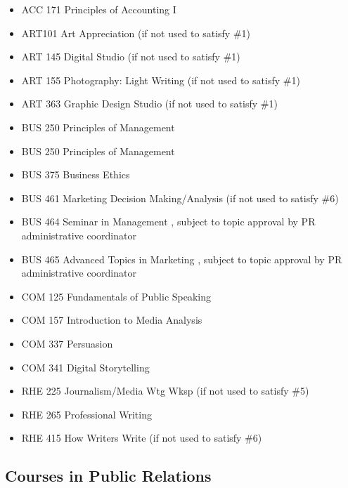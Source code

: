 \documentclass[
  letterpaper,
]{scrbook}
\providecommand{\tightlist}{%
  \setlength{\itemsep}{0pt}\setlength{\parskip}{0pt}}
\begin{document}
\begin{enumerate}
  \begin{itemize}
  \tightlist
  \item
    ACC 171 Principles of Accounting I
  \item
    ART101 Art Appreciation (if not used to satisfy \#1)
  \item
    ART 145 Digital Studio (if not used to satisfy \#1)
  \item
    ART 155 Photography: Light Writing (if not used to satisfy \#1)
  \item
    ART 363 Graphic Design Studio (if not used to satisfy \#1)
  \item
    BUS 250 Principles of Management
  \item
    BUS 250 Principles of Management
  \item
    BUS 375 Business Ethics
  \item
    BUS 461 Marketing Decision Making/Analysis (if not used to satisfy
    \#6)
  \item
    BUS 464 Seminar in Management , subject to topic approval by PR
    administrative coordinator
  \item
    BUS 465 Advanced Topics in Marketing , subject to topic approval by
    PR administrative coordinator
  \item
    COM 125 Fundamentals of Public Speaking
  \item
    COM 157 Introduction to Media Analysis
  \item
    COM 337 Persuasion
  \item
    COM 341 Digital Storytelling
  \item
    RHE 225 Journalism/Media Wtg Wksp (if not used to satisfy \#5)
  \item
    RHE 265 Professional Writing
  \item
    RHE 415 How Writers Write (if not used to satisfy \#6)
  \end{itemize}
\end{enumerate}

\subsection{Courses in Public
Relations}\label{courses-in-public-relations}
\end{document}
